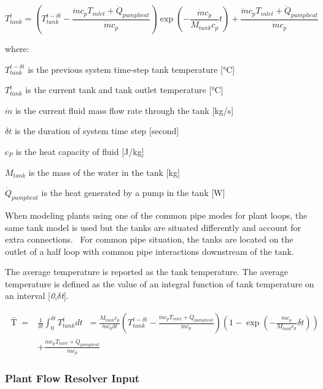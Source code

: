 \begin{equation}
T_{tank}^t = \left( {T_{tank}^{t - \delta t} - \frac{{\dot m{c_p}{T_{inlet}} + {{\dot Q}_{pumpheat}}}}{{\dot m{c_p}}}} \right)\exp \left( { - \frac{{\dot m{c_p}}}{{{M_{tank}}{c_p}}}t} \right) + \frac{{\dot m{c_p}{T_{inlet}} + {{\dot Q}_{pumpheat}}}}{{\dot m{c_p}}}
\end{equation}

where:

\(T_{tank}^{t - \delta t}\) is the previous system time-step tank temperature {[}°C{]}

\(T_{tank}^t\) is the current tank and tank outlet temperature {[}°C{]}

\(\dot m\) is the current fluid mass flow rate through the tank {[}kg/s{]}

\(\delta t\) is the duration of system time step {[}second{]}

\({c_P}\) is the heat capacity of fluid {[}J/kg{]}

\({M_{tank}}\) is the mass of the water in the tank {[}kg{]}

\({\dot Q_{pumpheat}}\) is the heat generated by a pump in the tank {[}W{]}

When modeling plants using one of the common pipe modes for plant loops, the same tank model is used but the tanks are situated differently and account for extra connections.~ For common pipe situation, the tanks are located on the outlet of a half loop with common pipe interactions downstream of the tank.

The average temperature is reported as the tank temperature. The average temperature is defined as the value of an integral function of tank temperature on an interval {[}\emph{0},\emph{\(\delta\)t}{]}.

\begin{equation}
\begin{split}
\mathop T\limits^ -   =& \frac{1}{{\delta t}}\int_0^{\delta t} {T_{tank}^tdt} \;\; = \frac{{{M_{tank}}{c_p}}}{{\dot m{c_p}\delta t}}\left( {T_{tank}^{t - \delta t} - \frac{{\dot m{c_p}{T_{inlet}} + {{\dot Q}_{pumpheat}}}}{{\dot m{c_p}}}} \right)\left( {1 - \exp \left( { - \frac{{\dot m{c_p}}}{{{M_{tank}}{c_p}}}\delta t} \right)} \right) \\
&+ \frac{{\dot m{c_p}{T_{inlet}} + {{\dot Q}_{pumpheat}}}}{{\dot m{c_p}}}
\end{split}
\end{equation}

\subsubsection{Plant Flow Resolver Input}\label{plant-flow-resolver-input}

